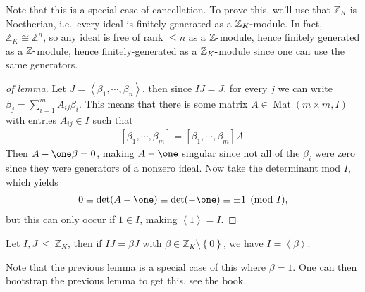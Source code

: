 \begin{remark}

Note that this is a special case of cancellation. To prove this, we'll
use that \({\mathbb{Z}}_K\) is Noetherian, i.e.~every ideal is finitely
generated as a \({\mathbb{Z}}_K{\hbox{-}}\)module. In fact,
\({\mathbb{Z}}_K \cong {\mathbb{Z}}^n\), so any ideal is free of rank
\(\leq n\) as a \({\mathbb{Z}}{\hbox{-}}\)module, hence finitely
generated as a \({\mathbb{Z}}{\hbox{-}}\)module, hence
finitely-generated as a \({\mathbb{Z}}_K{\hbox{-}}\)module since one can
use the same generators.

\end{remark}

\begin{proof}[of lemma]

Let \(J = \left\langle{ \beta_1, \cdots, \beta_n }\right\rangle\), then
since \(IJ = J\), for every \(j\) we can write
\(\beta_j = \sum_{i=1}^m A_{ij} \beta_i\). This means that there is some
matrix \(A\in \operatorname{Mat}(m\times m, I)\) with entries
\(A_{ij} \in I\) such that
\begin{align*}
{\left[ {\beta_1, \cdots, \beta_m} \right]}
=
{\left[ {\beta_1, \cdots, \beta_m} \right]}A
.\end{align*}
Then \(A-\one \mathbf{\beta} = 0\), making \(A-\one\) singular since not
all of the \(\beta_i\) were zero since they were generators of a nonzero
ideal. Now take the determinant mod \(I\), which yields
\begin{align*}
0 \equiv \det(A-\one) \equiv \det(-\one) \equiv \pm 1\pmod I
,\end{align*}
but this can only occur if \(1\in I\), making
\(\left\langle{ 1 }\right\rangle= I\).

\end{proof}

\begin{lemma}

Let \(I, J{~\trianglelefteq~}{\mathbb{Z}}_K\), then if \(IJ = \beta J\)
with \(\beta \in {\mathbb{Z}}_K \setminus\left\{{0}\right\}\), we have
\(I = \left\langle{ \beta }\right\rangle\).

\end{lemma}

\begin{remark}

Note that the previous lemma is a special case of this where
\(\beta = 1\). One can then bootstrap the previous lemma to get this,
see the book.

\end{remark}

